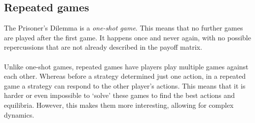 \subsection{Repeated games}\label{subs:repeated-games}
The Prisoner's Dilemma is a \textit{one-shot game}. This means that no further games are played after the first game. It happens once and never again, with no possible repercussions that are not already described in the payoff matrix.\\
\\
Unlike one-shot games, repeated games have players play multiple games against each other. Whereas before a strategy determined just one action, in a repeated game a strategy can respond to the other player's actions. This means that it is harder or even impossible to `solve' these games to find the best actions and equilibria. However, this makes them more interesting, allowing for complex dynamics.
